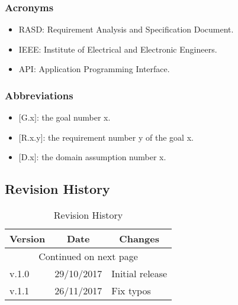 \subsubsection{Acronyms}
\begin{itemize}
\renewcommand{\labelitemi}{$-$}
\item
RASD: Requirement Analysis and Specification Document.
\item
IEEE: Institute of Electrical and Electronic Engineers.
\item
API: Application Programming Interface.
\end{itemize}

\subsubsection{Abbreviations}
\begin{itemize}
\renewcommand{\labelitemi}{$-$}
\item
$[$G.x$]$: the goal number x.
\item
$[$R.x.y$]$: the requirement number y of the goal x.
\item
$[$D.x$]$: the domain assumption number x.
\end{itemize}

\subsection{Revision History}
\begin{center}
\begin{longtable}{|p{2cm} | p{3cm}| p{8cm}|}
\hline \multicolumn{1}{|c|}{\textbf{Version}} & \multicolumn{1}{c|}{\textbf{Date}} & \multicolumn{1}{c|}{\textbf{Changes}} \\ \hline 
\endfirsthead
\hline
\endhead
\hline \multicolumn{3}{c}{{Continued on next page}} \\
\endfoot
\hline
\caption{Revision History}
\label{ref:revision}
\endlastfoot
v.1.0 & 29/10/2017 & Initial release \\
\hline 
v.1.1 & 26/11/2017 & Fix typos\\ 
\end{longtable}
\end{center}

